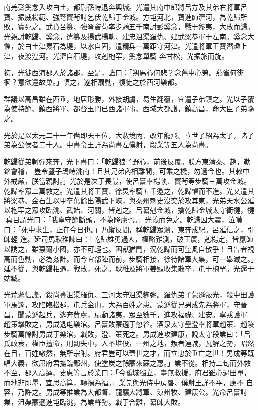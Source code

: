 \begin{pinyinscope}
 南羌彭奚念入攻白土，都尉孫峙退奔興城。光遣其南中郎將呂方及其弟右將軍呂寶、振威楊範、強弩竇茍討乞伏乾歸于金城。方屯河北，寶進師濟河，為乾歸所敗，寶死之。武賁呂篡、強弩竇茍率步騎五千南討彭奚念，戰于盤夷，大敗而歸。光親討乾歸、奚念，遣纂及揚武楊軌、建忠沮渠羅仇、建武梁恭軍于左南。奚念大懼，於白土津累石為堤，以水自固，遣精兵一萬距守河津。光遣將軍王寶潛趣上津，夜渡湟河。光濟自石堤，攻剋枹罕，奚念單騎
 奔甘松，光振旅而旋。



 初，光徙西海郡人於諸郡，至是，謠曰：「朔馬心何悲？念舊中心勞。燕雀何徘徊？意欲還故巢。」頃之，遂相扇動，復徙之於西河樂都。



 群議以高昌雖在西垂，地居形勝，外接胡虜，易生翻覆，宜遣子弟鎮之。光以子覆為使持節、鎮西將軍、都督玉門已西諸軍事、西域大都護，鎮高昌，命大臣子弟隨之。



 光於是以太元二十一年僭即天王位，大赦境內，改年龍飛。立世子紹為太子，諸子弟為公侯者二十人。中書令王詳為尚書左僕射，段業等五人為尚書。



 乾歸從弟軻彈來奔，光下書曰：「乾歸狼子野心，前後反覆。朕方東清秦、趙，勒銘會稽，
 豈令豎子鴟峙洮南！且其兄弟內相離間，可乘之機，勿過今也。其敕中外戒嚴，朕當親討。」光於是次于長最，使呂纂率楊軌、竇茍等步騎三萬攻金城。乾歸率眾二萬救之。光遣其將王寶、徐炅率騎五千邀之，乾歸懼而不進。光又遣其將梁恭、金石生以甲卒萬餘出陽武下峽，與秦州刺史沒奕於攻其東，光弟天水公延以枹罕之眾攻臨洮、武始、河關，皆剋之。呂纂剋金城，擒乾歸金城太守衛犍，犍真目謂光曰：「我寧守節斷頭，不為降虜也。」光義而免之。乾歸因大震，泣嘆曰：「死中求生，正在今日也。」乃縱反間，稱乾歸眾潰，東奔成紀。呂延信之，引師輕
 進。延司馬耿稚諫曰：「乾歸雄勇過人，權略難測，破王廣，剋楊定，皆羸師以誘之，雖蕞爾小國，亦不可輕也。困獸猶鬥，況乾歸而可望風自散乎！且告者視高而色動，必為姦計。而今宜部陣而前，步騎相接，徐待諸軍大集，可一舉滅之。」延不從，與乾歸相遇，戰敗，死之。耿稚及將軍姜顯收集散卒，屯于枹罕。光還于姑臧。



 光荒耄信讒，殺尚書沮渠羅仇、三河太守沮渠麴粥。羅仇弟子蒙遜叛光，殺中田護軍馬邃，攻陷臨松郡，屯兵金山，大為百姓之患。蒙遜從兄男成先為將軍，守晉昌，聞蒙遜起兵，逃奔貲虜，扇動諸夷，眾至數千，進攻福祿、建安。寧戎護軍
 趙策擊敗之，男成退屯樂涫。呂纂敗蒙遜于忽谷。酒泉太守壘澄率將軍趙策、趙陵步騎萬餘討男成于樂涫，戰敗，澄、策死之。男成進攻建康，說太守段業曰：「呂氏政衰，權臣擅命，刑罰失中，人不堪役，一州之地，叛者連城，瓦解之勢，昭然在目，百姓嗷然，無所宗附。府君豈可以蓋世之才，而立忠於垂亡之世！男成等既唱大義，欲屈府君撫臨鄙州，使塗炭之餘蒙來蘇之惠。」業不從。相持二旬而外救不至，郡人高逵、史惠等言於業曰：「今孤城獨立，臺無救援，府君雖心過田單，而地非即墨，宜思高算，轉禍為福。」業先與光侍中房晷、僕射王詳不平，慮不
 自容，乃許之。男成等推業為大都督、龍驤大將軍、涼州牧、建康公。光命呂纂討業，沮渠蒙遜進屯臨洮，為業聲勢。戰于合離，纂師大敗。




\end{pinyinscope}
